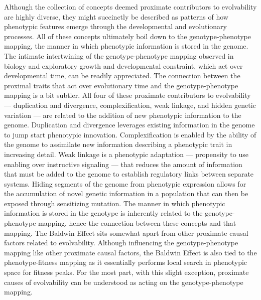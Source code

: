 Although the collection of concepts deemed proximate contributors to evolvability are highly diverse, they might succinctly be described as patterns of how phenotypic features emerge through the developmental and evolutionary processes.
All of these concepts ultimately boil down to the genotype-phenotype mapping, the manner in which phenotypic information is stored in the genome.
The intimate intertwining of the genotype-phenotype mapping observed in biology and exploratory growth and developmental constraint, which act over developmental time, can be readily appreciated.
The connection between the proximal traits that act over evolutionary time and the genotype-phenotype mapping is a bit subtler.
All four of these proximate contributors to evolvability --- duplication and divergence, complexification, weak linkage, and hidden genetic variation --- are related to the addition of new phenotypic information to the genome.
Duplication and divergence leverages existing information in the genome to jump start phenotypic innovation.
Complexification is enabled by the ability of the genome to assimilate new information describing a phenotypic trait in increasing detail.
Weak linkage is a phenotypic adaptation --- propensity to use enabling over instructive signaling --- that reduces the amount of information that must be added to the genome to establish regulatory links between separate systems.
Hiding segments of the genome from phenotypic expression allows for the accumulation of novel genetic information in a population that can then be exposed through sensitizing mutation.
The manner in which phenotypic information is stored in the genotype is inherently related to the genotype-phenotype mapping, hence the connection between these concepts and that mapping.
The Baldwin Effect sits somewhat apart from other proximate causal factors related to evolvability.
Although influencing the genotype-phenotype mapping like other proximate causal factors, the Baldwin Effect is also tied to the phenotype-fitness mapping as it essentially performs local search in phenotypic space for fitness peaks.
For the most part, with this slight exception, proximate causes of evolvability can be understood as acting on the genotype-phenotype mapping. 

